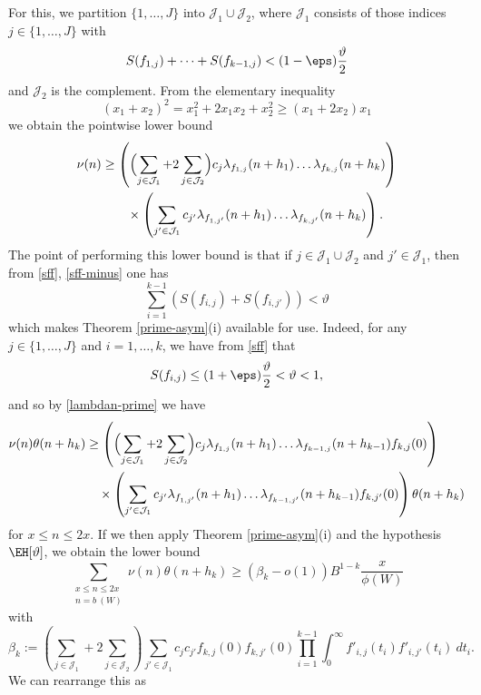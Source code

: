 For this, we partition $\{1,\dots,J\}$ into ${\mathcal J}_1 \cup {\mathcal J}_2$, where ${\mathcal J}_1$ consists of those indices $j \in \{1,\dots,J\}$ with
\begin{equation}\label{sff-minus}
S(f_{1,j}) + \dots + S(f_{k-1,j}) < (1-\eps) \frac{\vartheta}{2}
\end{equation}
and ${\mathcal J}_2$ is the complement.  From the elementary inequality
$$ (x_1 + x_2)^2 = x_1^2 + 2x_1 x_2 + x_2^2 \geq (x_1+2x_2) x_1 $$
we obtain the pointwise lower bound
\[\begin{split} 
\nu(n) &\geq 
\left( \Bigl(\sum_{j \in {\mathcal J}_1} + 2 \sum_{j \in {\mathcal J}_2}\Bigr) c_j \lambda_{f_{1,j}}(n+h_1) \dots \lambda_{f_{k,j}}(n+h_k) \right)\\
&\qquad \times
\left( \sum_{j' \in {\mathcal J}_1} c_{j'} \lambda_{f_{1,j'}}(n+h_1) \dots \lambda_{f_{k,j'}}(n+h_k) \right).
\end{split}\]
The point of performing this lower bound is that if $j \in {\mathcal J}_1 \cup {\mathcal J}_2$ and $j' \in {\mathcal J}_1$, then from \eqref{sff}, \eqref{sff-minus} one has
$$ \sum_{i=1}^{k-1}( S(f_{i,j}) + S(f_{i,j'}) )< \vartheta$$
which makes Theorem \ref{prime-asym}(i) available for use.  Indeed, for any $j \in \{1,\dots,J\}$ and $i=1,\dots,k$, we have from \eqref{sff} that
$$ S(f_{i,j}) \leq (1+\eps) \frac{\vartheta}{2} < \vartheta < 1, $$
and so by \eqref{lambdan-prime} we have
\begin{equation}\label{nutheta}
\begin{split}
 \nu(n) \theta(n+h_k) &\geq 
\left( \Bigl(\sum_{j \in {\mathcal J}_1} + 2 \sum_{j \in {\mathcal J}_2}\Bigr) c_j \lambda_{f_{1,j}}(n+h_1) \dots \lambda_{f_{k-1,j}}(n+h_{k-1}) f_{k,j}(0) \right)\\
&\quad \times \left( \sum_{j' \in {\mathcal J}_1} c_{j'} \lambda_{f_{1,j'}}(n+h_1) \dots \lambda_{f_{k-1,j'}}(n+h_{k-1}) f_{k,j'}(0) \right) \theta(n+h_k)
\end{split}
\end{equation}
for $x \leq n \leq 2x$.  If we then apply Theorem \ref{prime-asym}(i) and the hypothesis $\EH[\vartheta]$, we obtain the lower bound
$$ 
 \sum_{\substack{x \leq n \leq 2x\\ n = b\ (W)}} \nu(n) \theta(n+h_k) \geq (\beta_k - o(1)) B^{1-k} \frac{x}{\phi(W)}$$
with
$$ \beta_k :=
(\sum_{j \in {\mathcal J}_1} + 2 \sum_{j \in {\mathcal J}_2}) \sum_{j' \in {\mathcal J}_1} c_j c_{j'} f_{k,j}(0) f_{k,j'}(0)
\prod_{i=1}^{k-1} \int_0^\infty f'_{i,j}(t_i) f'_{i,j'}(t_i)\ dt_i. $$
We can rearrange this as
